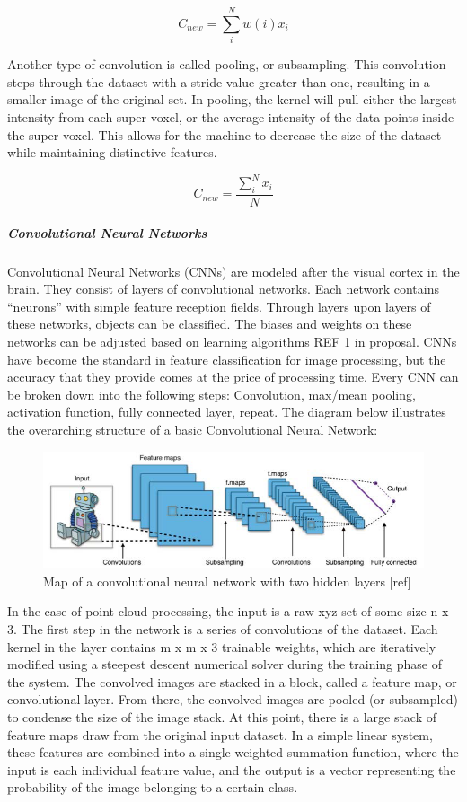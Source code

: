 \documentclass[12pt]{drexelthesis}
\begin{document}
\begin{equation}
	C_{new} = \sum_{i}^{N}  w(i) x_{i}
\end{equation}

Another type of convolution is called pooling, or subsampling. This convolution steps through the dataset with a stride value greater than one, resulting in a smaller image of the original set. In pooling, the kernel will pull either the largest intensity from each super-voxel, or the average intensity of the data points inside the super-voxel. This allows for the machine to decrease the size of the dataset while maintaining distinctive features.

\begin{equation}
	C_{new} = \frac{\sum_{i}^{N}  x_{i}}{N}
\end{equation}

\subparagraph{Convolutional Neural Networks}
Convolutional Neural Networks (CNNs) are modeled after the visual cortex in the brain. They consist of layers of convolutional networks. Each network contains “neurons” with simple feature reception fields. Through layers upon layers of these networks, objects can be classified. The biases and weights on these networks can be adjusted based on learning algorithms REF 1 in proposal. CNNs have become the standard in feature classification for image processing, but the accuracy that they provide comes at the price of processing time. 
Every CNN can be broken down into the following steps: Convolution, max/mean pooling, activation function, fully connected layer, repeat. The diagram below illustrates the overarching structure of a basic Convolutional Neural Network:
\begin{figure}[!ht]
	\centering
		\includegraphics[width=6in]{cnn.png}
	\caption[High level flow chart of a convolutional neural network]{\centering Map of a convolutional neural network with two hidden layers [ref]}
\end{figure}

In the case of point cloud processing, the input is a raw xyz set of some size n x 3. The first step in the network is a series of convolutions of the dataset. Each kernel in the layer contains m x m x 3 trainable weights, which are iteratively modified using a steepest descent numerical solver during the training phase of the system. The convolved images are stacked in a block, called a feature map, or convolutional layer. From there, the convolved images are pooled (or subsampled) to condense the size of the image stack. 
At this point, there is a large stack of feature maps draw from the original input dataset. In a simple linear system, these features are combined into a single weighted summation function, where the input is each individual feature value, and the output is a vector representing the probability of the image belonging to a certain class.
\end{document}
